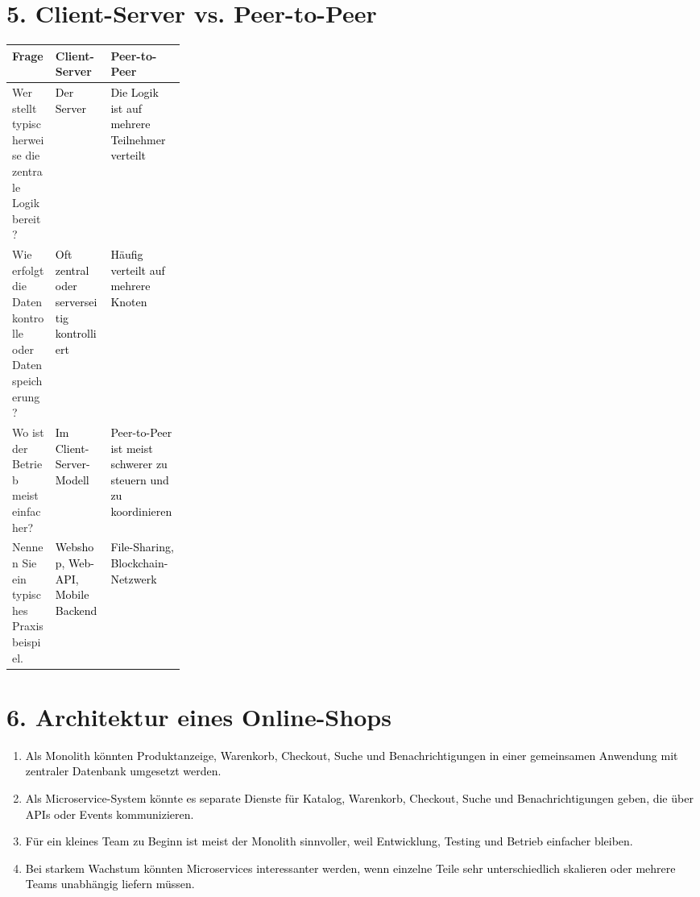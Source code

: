 \documentclass[11pt,a4paper]{article}
\newcommand{\solution}[1]{\textcolor{black}{#1}}
\begin{document}
\section*{5. Client-Server vs. Peer-to-Peer}
\begin{tabularx}{\linewidth}{|>{\raggedright\arraybackslash}p{0.25\linewidth}|>{\raggedright\arraybackslash}X|>{\raggedright\arraybackslash}X|}
\hline
\textbf{Frage} & \textbf{Client-Server} & \textbf{Peer-to-Peer} \\
\hline
Wer stellt typischerweise die zentrale Logik bereit? & \solution{Der Server} & \solution{Die Logik ist auf mehrere Teilnehmer verteilt} \\ \hline
Wie erfolgt die Datenkontrolle oder Datenspeicherung? & \solution{Oft zentral oder serverseitig kontrolliert} & \solution{Häufig verteilt auf mehrere Knoten} \\ \hline
Wo ist der Betrieb meist einfacher? & \solution{Im Client-Server-Modell} & \solution{Peer-to-Peer ist meist schwerer zu steuern und zu koordinieren} \\ \hline
Nennen Sie ein typisches Praxisbeispiel. & \solution{Webshop, Web-API, Mobile Backend} & \solution{File-Sharing, Blockchain-Netzwerk} \\ \hline
\end{tabularx}

\section*{6. Architektur eines Online-Shops}
\begin{enumerate}
  \item \solution{Als Monolith könnten Produktanzeige, Warenkorb, Checkout, Suche und Benachrichtigungen in einer gemeinsamen Anwendung mit zentraler Datenbank umgesetzt werden.}
  \item \solution{Als Microservice-System könnte es separate Dienste für Katalog, Warenkorb, Checkout, Suche und Benachrichtigungen geben, die über APIs oder Events kommunizieren.}
  \item \solution{Für ein kleines Team zu Beginn ist meist der Monolith sinnvoller, weil Entwicklung, Testing und Betrieb einfacher bleiben.}
  \item \solution{Bei starkem Wachstum könnten Microservices interessanter werden, wenn einzelne Teile sehr unterschiedlich skalieren oder mehrere Teams unabhängig liefern müssen.}
\end{enumerate}
\end{document}
